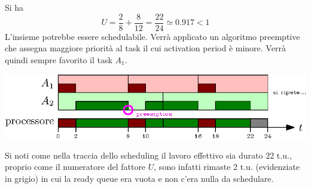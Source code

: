 \documentclass[10pt, letterpaper]{report}
\begin{document}
Si ha 
$$ U=\frac{2}{8}+\frac{8}{12}=\frac{22}{24}\simeq 0.917 < 1$$
L'insieme potrebbe essere schedulabile. Verrà applicato un algoritmo preemptive che 
assegna maggiore priorità al task il cui activation period è minore. Verrà quindi sempre favorito il 
task $A_1$.\begin{center}
\includegraphics[width=1\textwidth ]{images/schedulingCondt.eps}
\end{center}
Si noti come nella traccia dello scheduling il lavoro effettivo sia durato 22 t.u., proprio come 
il numeratore del fattore $U$, sono infatti rimaste 2 t.u. (evidenziate in grigio) in cui 
la ready queue era vuota e non c'era nulla da schedulare. 
\end{document}
